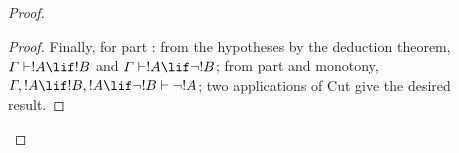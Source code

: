 \documentclass[../../include/open-logic-section]{subfiles}
\begin{document}
\begin{proof}
\begin{proof}
\smallskip\noindent Finally, for part
: from the hypotheses by the
deduction theorem, $\Gamma \Proves !A \lif !B$ and $\Gamma \Proves !A \lif
\lnot !B$; from part  and monotony,
$\Gamma, !A \lif !B, !A \lif \lnot !B \Proves \lnot !A$; two applications
of Cut give the desired result. \end{proof} \end{proof}
\end{document}
